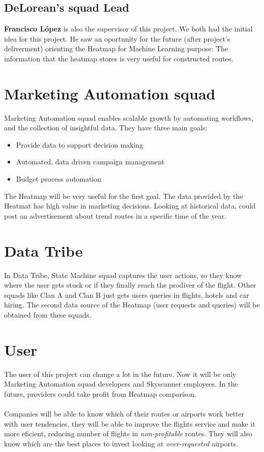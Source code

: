 \subsection*{DeLorean's squad Lead}

\textbf{Francisco López} is also the supervisor of this project. We both had the initial idea for this project. He saw an oportunity for the future (after project's deliverment) orienting the Heatmap for Machine Learning purpose: The information that the heatmap stores is very useful for constructed routes.


\section{Marketing Automation squad} \label{mas}

Marketing Automation squad enables scalable growth by automating workflows, and the collection of insightful data. They have three main goals:

\begin{itemize}
  \item Provide data to support decision making
  \item Automated, data driven campaign management
  \item Budget process automation
\end{itemize}

The Heatmap will be very useful for the first goal. The data provided by the Heatmat has high value in marketing decisions. Looking at historical data,  could post an advertisement about trend routes in a specific time of the year.

\section{Data Tribe}

In Data Tribe, State Machine squad captures the user actions, so they know where the user gets stuck or if they finally reach the prodiver of the flight. Other squads like Clan A and Clan B just gets users queries in flights, hotels and car hiring. The second data source of the Heatmap (user requests and queries) will be obtained from these squads.

\section{User}

The user of this project can change a lot in the future. Now it will be only Marketing Automation squad developers and Skyscanner employees. In the future, providers could take profit from Heatmap comparison.
\\\\
Companies will be able to know which of their routes or airports work better with user tendencies, they will be able to improve the flights service and make it more eficient, reducing number of flights in \textit{non-profitable} routes. They will also know which are the best places to invest looking at \textit{over-requested} airports.